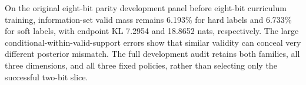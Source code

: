 On the original eight-bit parity development panel before eight-bit curriculum training, information-set valid mass remains 6.193\% for hard labels and 6.733\% for soft labels, with endpoint KL 7.2954 and 18.8652 nats, respectively. The large conditional-within-valid-support errors show that similar validity can conceal very different posterior mismatch. The full development audit retains both families, all three dimensions, and all three fixed policies, rather than selecting only the successful two-bit slice.
